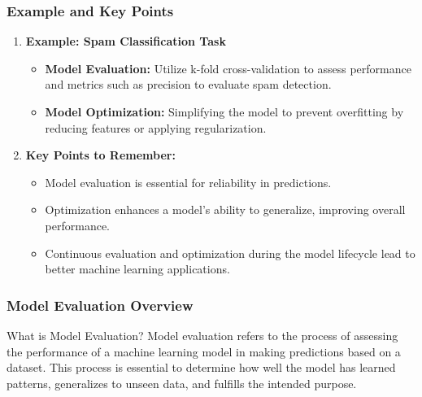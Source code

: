 \documentclass{beamer}
\begin{document}
\begin{frame}[fragile]
    \frametitle{Example and Key Points}
    \begin{enumerate}
        \item \textbf{Example: Spam Classification Task}
        \begin{itemize}
            \item \textbf{Model Evaluation:} Utilize k-fold cross-validation to assess performance and metrics such as precision to evaluate spam detection.
            \item \textbf{Model Optimization:} Simplifying the model to prevent overfitting by reducing features or applying regularization.
        \end{itemize}
        
        \item \textbf{Key Points to Remember:}
        \begin{itemize}
            \item Model evaluation is essential for reliability in predictions.
            \item Optimization enhances a model's ability to generalize, improving overall performance.
            \item Continuous evaluation and optimization during the model lifecycle lead to better machine learning applications.
        \end{itemize}
    \end{enumerate}
\end{frame}

\begin{frame}[fragile]
    \frametitle{Model Evaluation Overview}
    \begin{block}{What is Model Evaluation?}
        Model evaluation refers to the process of assessing the performance of a machine learning model in making predictions based on a dataset.
        This process is essential to determine how well the model has learned patterns, generalizes to unseen data, and fulfills the intended purpose.
    \end{block}
\end{frame}
\end{document}
